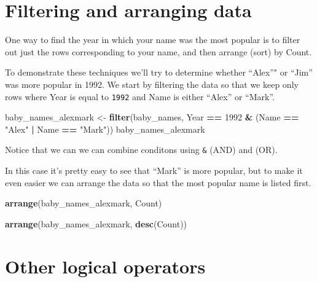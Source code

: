 \documentclass[]{book}
\newenvironment{Shaded}{\begin{snugshade}}{\end{snugshade}}
\newcommand{\KeywordTok}[1]{\textcolor[rgb]{0.13,0.29,0.53}{\textbf{#1}}}
\newcommand{\DecValTok}[1]{\textcolor[rgb]{0.00,0.00,0.81}{#1}}
\newcommand{\StringTok}[1]{\textcolor[rgb]{0.31,0.60,0.02}{#1}}
\newcommand{\OperatorTok}[1]{\textcolor[rgb]{0.81,0.36,0.00}{\textbf{#1}}}
\newcommand{\NormalTok}[1]{#1}
\begin{document}
\section{Filtering and arranging
data}\label{filtering-and-arranging-data}

One way to find the year in which your name was the most popular is to
filter out just the rows corresponding to your name, and then arrange
(sort) by Count.

To demonstrate these techniques we'll try to determine whether ``Alex''"
or ``Jim'' was more popular in 1992. We start by filtering the data so
that we keep only rows where Year is equal to \texttt{1992} and Name is
either ``Alex'' or ``Mark''.

\begin{Shaded}
\begin{Highlighting}[]
\NormalTok{baby_names_alexmark <-}\StringTok{ }\KeywordTok{filter}\NormalTok{(baby_names, }
\NormalTok{             Year }\OperatorTok{==}\StringTok{ }\DecValTok{1992} \OperatorTok{&}\StringTok{ }\NormalTok{(Name }\OperatorTok{==}\StringTok{ "Alex"} \OperatorTok{|}\StringTok{ }\NormalTok{Name }\OperatorTok{==}\StringTok{ "Mark"}\NormalTok{))}
\NormalTok{baby_names_alexmark}
\end{Highlighting}
\end{Shaded}

Notice that we can we can combine conditons using \texttt{\&} (AND) and
\texttt{\textbar{}} (OR).

In this case it's pretty easy to see that ``Mark'' is more popular, but
to make it even easier we can arrange the data so that the most popular
name is listed first.

\begin{Shaded}
\begin{Highlighting}[]
\KeywordTok{arrange}\NormalTok{(baby_names_alexmark, Count)}
\end{Highlighting}
\end{Shaded}

\begin{Shaded}
\begin{Highlighting}[]
\KeywordTok{arrange}\NormalTok{(baby_names_alexmark, }\KeywordTok{desc}\NormalTok{(Count))}
\end{Highlighting}
\end{Shaded}

\section{Other logical operators}\label{other-logical-operators}
\end{document}
